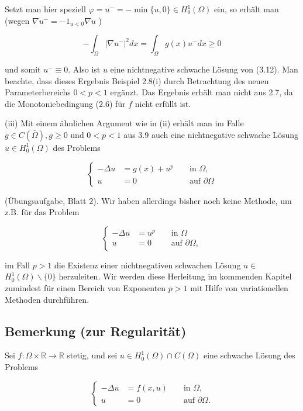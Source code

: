 \documentclass[10pt, letterpaper]{article}
\begin{document}
Setzt man hier speziell $\varphi=u^{-}=-\min \{u, 0\} \in H_{0}^{1}(\Omega)$ ein, so erhält man (wegen $\nabla u^{-}=-1_{u<0} \nabla u$ )

$$
-\int_{\Omega}\left|\nabla u^{-}\right|^{2} d x=\int_{\Omega} g(x) u^{-} d x \geq 0
$$

und somit $u^{-} \equiv 0$. Also ist $u$ eine nichtnegative schwache Lösung von (3.12). Man beachte, dass dieses Ergebnis Beispiel 2.8(i) durch Betrachtung des neuen Parameterbereichs $0<p<1$ ergänzt. Das Ergebnis erhält man nicht aus 2.7, da die Monotoniebedingung (2.6) für $f$ nicht erfüllt ist.

(iii) Mit einem ähnlichen Argument wie in (ii) erhält man im Falle $g \in C(\bar{\Omega}), g \geq 0$ und $0<p<1$ aus 3.9 auch eine nichtnegative schwache Lösung $u \in H_{0}^{1}(\Omega)$ des Problems

$$
\left\{\begin{aligned}
-\Delta u & =g(x)+u^{p} & & \text { in } \Omega, \\
u & =0 & & \text { auf } \partial \Omega
\end{aligned}\right.
$$

(Übungsaufgabe, Blatt 2). Wir haben allerdings bisher noch keine Methode, um z.B. für das Problem

$$
\left\{\begin{aligned}
-\Delta u & =u^{p} & & \text { in } \Omega \\
u & =0 & & \text { auf } \partial \Omega,
\end{aligned}\right.
$$

im Fall $p>1$ die Existenz einer nichtnegativen schwachen Lösung $u \in$ $H_{0}^{1}(\Omega) \backslash\{0\}$ herzuleiten. Wir werden diese Herleitung im kommenden Kapitel zumindest für einen Bereich von Exponenten $p>1$ mit Hilfe von variationellen Methoden durchführen.

\subsection*{Bemerkung (zur Regularität)}

Sei $f: \Omega \times \mathbb{R} \rightarrow \mathbb{R}$ stetig, und sei $u \in H_{0}^{1}(\Omega) \cap C(\Omega)$ eine schwache Lösung des Problems

$$
\left\{\begin{aligned}
-\Delta u & =f(x, u) & & \text { in } \Omega, \\
u & =0 & & \text { auf } \partial \Omega .
\end{aligned}\right.
$$
\end{document}
